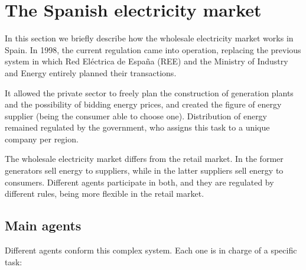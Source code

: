 \chapter{The Spanish electricity market}
\label{ch:electricity-market}
In this section we briefly describe how the wholesale electricity market works in Spain.
In 1998, the current regulation came into operation, replacing the previous system in which Red Eléctrica de España (REE) and the Ministry of Industry and Energy entirely planned their transactions.

It allowed the private sector to freely plan the construction of generation plants and the possibility of bidding energy prices, and created the figure of energy supplier (being the consumer able to choose one).
Distribution of energy remained regulated by the government, who assigns this task to a unique company per region. \cite{mercado-electrico-mincotur}

The wholesale electricity market differs from the retail market. In the former generators sell energy to suppliers, while in the latter suppliers sell energy to consumers. Different agents participate in both, and they are regulated by different rules, being more flexible in the retail market.

\section{Main agents}
Different agents conform this complex system. Each one is in charge of a specific task:\cite{mercado-electrico-endesa, organismos-reguladores-holaluz}

